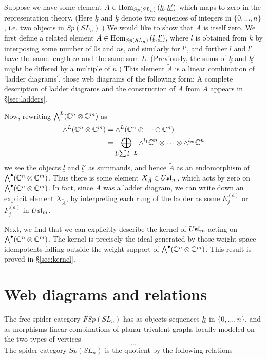 \documentclass[11pt,leqno]{article}
\begin{document}
Suppose we have some element $A \in \operatorname{Hom}_{Sp(SL_n)}\left(\underline{k},\underline{k'}\right)$ which maps to zero in the representation theory. (Here $\underline{k}$ and $\underline{k}$ denote two sequences of integers in $\{0,\ldots,n\}$, i.e. two objects in $Sp(SL_n)$.) We would like to show that $A$ is itself zero. We first define a related element $\tilde{A} \in \operatorname{Hom}_{Sp(SL_n)}\left(\underline{l},\underline{l'}\right)$, where $\underline{l}$ is obtained from $\underline{k}$ by interposing some number of $0$s and $n$s, and similarly for $\underline{l'}$, and further $\underline{l}$ and $\underline{l'}$ have the same length $m$ and the same sum $L$. (Previously, the sums of $\underline{k}$ and $\underline{k'}$ might be differed by a multiple of $n$.) This element $\tilde{A}$ is a linear combination of `ladder diagrams', those web diagrams of the following form:
A complete description of ladder diagrams and the construction of $\tilde{A}$ from $A$ appears in \S \ref{sec:ladders}.

Now, rewriting $\bigwedge^L(\mathbb C^n \otimes \mathbb C^m)$ as
\begin{align*}
\wedge^L(\mathbb C^n \otimes \mathbb C^m) & = \wedge^L(\mathbb C^n \oplus \cdots \oplus \mathbb C^n) \\
        & = \bigoplus_{\underline{l}: \sum \underline{l} = L} \wedge^{l_1} \mathbb C^n \otimes \cdots \otimes \wedge^{l_m} \mathbb C^n
\end{align*}
we see the objects $\underline{l}$ and $\underline{l}'$ as summands, and hence $\tilde{A}$ as an endomorphism of $\bigwedge^\bullet(\mathbb C^n \otimes \mathbb C^m)$. Thus there is some element $X_{\tilde{A}} \in U\mathfrak{sl}_{m}$, which acts by zero on $\bigwedge^\bullet(\mathbb C^n \otimes \mathbb C^m)$. In fact, since $\tilde{A}$ was a ladder diagram, we can write down an explicit element $X_{\tilde{A}}$, by interpreting each rung of the ladder as some $E^{(a)}_j$ or $F^{(a)}_j$ in $U\mathfrak{sl}_{m}$. 

Next, we find that we can explicitly describe the kernel of $U\mathfrak{sl}_{m}$ acting on $\bigwedge^\bullet(\mathbb C^n \otimes \mathbb C^m)$. The kernel is precisely the ideal generated by those weight space idempotents falling outside the weight support of $\bigwedge^\bullet(\mathbb C^n \otimes \mathbb C^m)$.  This result is proved in \S \ref{sec:kernel}.


\section{Web diagrams and relations}
\label{sec:diagrams}
The free spider category $FSp(SL_n)$ has as objects sequences ${\underline{k}}$ in $\{0,\ldots,n\}$, and as morphisms linear combinations of planar trivalent graphs locally modeled on the two types of vertices
$$ ... $$
The spider category $Sp(SL_n)$ is the quotient by the following relations
\end{document}
